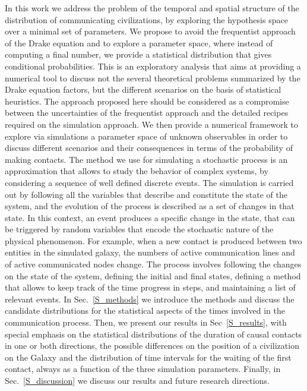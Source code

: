 \documentclass[crop]{CSLB}
\begin{document}
In this work we address the problem of the temporal and spatial
structure of the distribution of communicating civilizations, by
exploring the hypothesis space over a minimal set of parameters.
%
We propose to avoid the frequentist approach of the
Drake equation and to explore a parameter space, where instead of
computing a final number, we provide a statistical distribution that
gives conditional probabilities.
%
This is an exploratory analysis that aims at providing a numerical
tool to discuss not the several theoretical problems summarized by the
Drake equation factors, but the different scenarios on the basis of
statistical heuristics.
%
The approach proposed here should be considered as a compromise
between the uncertainties of the frequentist approach and the detailed
recipes required on the simulation approach.
%
We then provide a numerical framework to explore via simulations a
parameter space of unknown observables in order to discuss different
scenarios and their consequences in terms of the probability of
making contacts.
%
The method we use for simulating a stochastic process is an
approximation that allows to study the behavior of complex systems,
by considering a sequence of well defined discrete events.
%
The simulation is carried out by following all the variables that
describe and constitute the state of the system, and the evolution of
the process is described as a set of changes in that state.
%
In this context, an event produces a specific change in the state,
that can be triggered by random variables that encode the stochastic
nature of the physical phenomenon.
%
For example, when a new contact is produced between two entities in
the simulated galaxy, the numbers of active communication lines and of
active communicated nodes change.
%
The process involves following the changes on the state of the
system, defining the initial and final states, defining a method that
allows to keep track of the time progress in steps, and maintaining a
list of relevant events.
%
In Sec.~\ref{S_methods} we introduce the methods and discuss the
candidate distributions for the statistical aspects of the times
involved in the communication process.
%
Then, we present our results in Sec~\ref{S_results}, with special
emphasis on the statistical distributions of the duration of causal
contacts in one or both directions, the possible differences on the
position of a civilization on the Galaxy and the distribution of time
intervals for the waiting of the first contact, always as a function
of the three simulation parameters.
%
Finally, in Sec.~\ref{S_discussion} we discuss our results and future
research directions.
\end{document}
